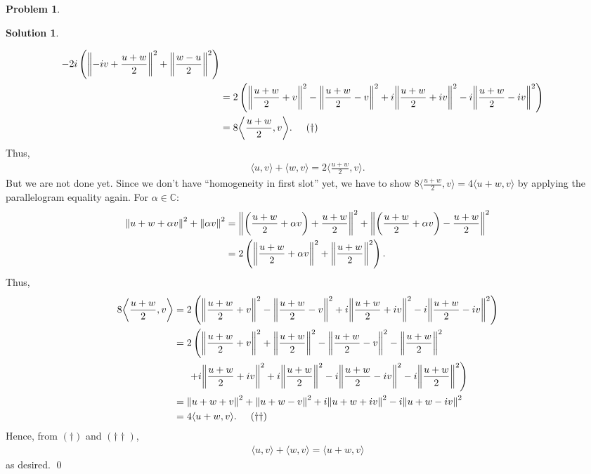 \documentclass{book}
\theoremstyle{definition}
\newtheorem*{prob*}{Problem}
\newtheorem*{sln*}{Solution}
\newcommand{\la}{\langle}
\newcommand{\ra}{\rangle}
\begin{document}
\begin{prob*}
\begin{enumerate}
\begin{sln*}
\begin{enumerate}
\begin{align*}
				- 2i\left( \norm{ -iv + \frac{u + w}{2}}^2 + \norm{\frac{w - u}{2}}^2 \right)\\
				&= 2\left( \norm{ \frac{u + w}{2}+ v}^2 - \norm{\frac{u + w}{2} -v}^2 + i\norm{\frac{u+w}{2}+iv}^2 - i\norm{\frac{u+w}{2}-iv}^2 \right)\\
				&= 8 \bigg\langle \frac{u+w}{2}, v \bigg\rangle. \hspace{0.5cm} (\dagger)
				\end{align*}
				Thus, 
				\begin{align*}
				\la u,v \ra + \la w, v \ra = 2\bigg\la \frac{u+w}{2} ,v \bigg\ra.
				\end{align*}
				But we are not done yet. Since we don't have ``homogeneity in first slot'' yet, we have to show $8 \bigg\langle \frac{u+w}{2}, v \bigg\rangle =4 \la u+ w, v \ra$ by applying the parallelogram equality again. For $\alpha \in \mathbb{C}$:
				\begin{align*}
				\norm{u + w + \alpha v}^2 + \norm{\alpha v}^2 &= \norm{\left(\frac{u+w}{2} + \alpha v \right)+ \frac{u+w}{2}}^2 + \norm{\left(\frac{u+w}{2} + \alpha v\right) - \frac{u+w}{2}}^2\\
				&= 2\left(  \norm{\frac{u+w}{2} + \alpha v}^2 + \norm{\frac{u+w}{2}}^2  \right).
				\end{align*} 
				Thus,
				\begin{align*}
				8 \bigg\langle \frac{u+w}{2}, v \bigg\rangle &= 2\left( \norm{ \frac{u + w}{2}+ v}^2 - \norm{\frac{u + w}{2} -v}^2 + i\norm{\frac{u+w}{2}+iv}^2 - i\norm{\frac{u+w}{2}-iv}^2 \right)\\
				&= 2\left( \norm{ \frac{u + w}{2}+ v}^2 + \norm{\frac{u+w}{2}}^2 - \norm{\frac{u + w}{2} -v}^2 - \norm{\frac{u+w}{2}}^2 \right.\\
				&\left.\hspace{0.5cm}+ i\norm{\frac{u+w}{2}+iv}^2 + i \norm{\frac{u+w}{2}}^2 - i\norm{\frac{u+w}{2}-iv}^2-i \norm{\frac{u+w}{2}}^2 \right)\\
				&= \norm{u+w + v}^2 + \norm{u+w-v}^2 + i \norm{u+w+iv}^2 - i\norm{u+w-iv}^2 \\
				&= 4\la u+w, v \ra. 	\hspace{0.5cm} (\dagger\dagger)
				\end{align*}
				Hence, from $(\dagger)$ and $(\dagger\dagger)$,
				\begin{align*}
				\la u,v \ra + \la w,v \ra = \la u+w,v \ra
				\end{align*}
				as desired. \qed
				

\end{enumerate}
\end{sln*}
\end{enumerate}
\end{prob*}
\end{document}
